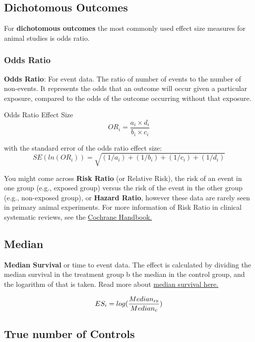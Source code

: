 \documentclass[
]{book}
\begin{document}
\hypertarget{dichotomous-outcomes}{%
\subsection{Dichotomous Outcomes}\label{dichotomous-outcomes}}

For \textbf{dichotomous outcomes} the most commonly used effect size measures for animal studies is odds ratio.

\hypertarget{odds-ratio}{%
\subsubsection{Odds Ratio}\label{odds-ratio}}

\textbf{Odds Ratio}: For event data. The ratio of number of events to the number of non-events. It represents the odds that an outcome will occur given a particular exposure, compared to the odds of the outcome occurring without that exposure.

Odds Ratio Effect Size
\[ OR_i = \frac {a_i \times d_i}{b_i \times c_i}  \]

with the standard error of the odds ratio effect size:
\[ SE(ln(OR_i)) = \sqrt{ (1/a_i)+(1/b_i)+(1/c_i)+(1/d_i) }   \]

You might come across \textbf{Risk Ratio} (or Relative Risk), the risk of an event in one group (e.g., exposed group) versus the risk of the event in the other group (e.g., non-exposed group), or \textbf{Hazard Ratio}, however these data are rarely seen in primary animal experiments. For more information of Risk Ratio in clinical systematic reviews, see the \href{https://handbook-5-1.cochrane.org/chapter_9/box_9_2_a_calculation_of_risk_ratio_rr_odds_ratio_or_and.htm}{Cochrane Handbook.}

\hypertarget{median}{%
\subsection{Median}\label{median}}

\textbf{Median Survival} or time to event data. The effect is calculated by dividing the median survival in the treatment group b the median in the control group, and the logarithm of that is taken. Read more about \href{https://systematicreviewsjournal.biomedcentral.com/articles/10.1186/s13643-021-01824-0}{median survival here.}

\[ ES_i = log (\frac{Median_{\rm rx}}{Median_c} ) \]

\hypertarget{true-number-of-controls}{%
\subsection{True number of Controls}\label{true-number-of-controls}}
\end{document}
